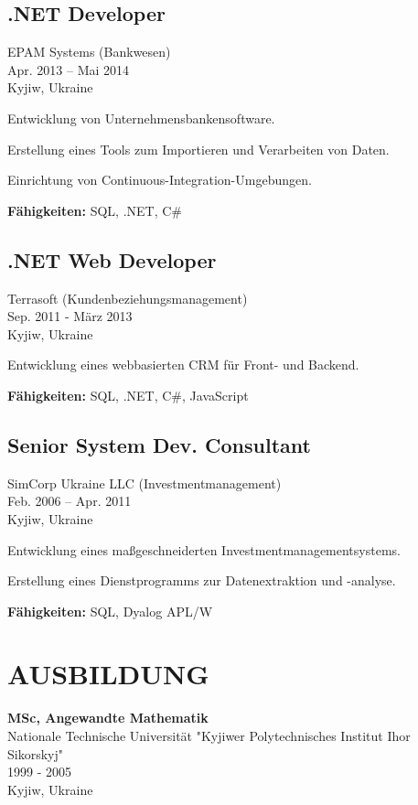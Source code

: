 \documentclass[a4paper,10pt]{article}
\begin{document}
\subsection*{.NET Developer}
EPAM Systems (Bankwesen) \\
Apr. 2013 – Mai 2014 \\
Kyjiw, Ukraine
\begin{bulletlist}
    \item Entwicklung von Unternehmensbankensoftware.
    \item Erstellung eines Tools zum Importieren und Verarbeiten von Daten.
    \item Einrichtung von Continuous-Integration-Umgebungen.
\end{bulletlist}
\textbf{Fähigkeiten:} SQL, .NET, C\#

\subsection*{.NET Web Developer}
Terrasoft (Kundenbeziehungsmanagement) \\
Sep. 2011 - März 2013 \\
Kyjiw, Ukraine
\begin{bulletlist}
    \item Entwicklung eines webbasierten CRM für Front- und Backend.
\end{bulletlist}
\textbf{Fähigkeiten:} SQL, .NET, C\#, JavaScript

\pagebreak

\subsection*{Senior System Dev. Consultant}
SimCorp Ukraine LLC (Investmentmanagement) \\
Feb. 2006 – Apr. 2011 \\
Kyjiw, Ukraine
\begin{bulletlist}
    \item Entwicklung eines maßgeschneiderten Investmentmanagementsystems.
    \item Erstellung eines Dienstprogramms zur Datenextraktion und -analyse.
\end{bulletlist}
\textbf{Fähigkeiten:} SQL, Dyalog APL/W

\section*{AUSBILDUNG}
\textbf{MSc, Angewandte Mathematik} \\
Nationale Technische Universität "Kyjiwer Polytechnisches Institut Ihor Sikorskyj" \\
1999 - 2005 \\
Kyjiw, Ukraine
\end{document}
